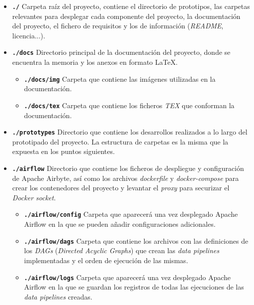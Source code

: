 \begin{itemize}
    \item \textbf{\texttt{./}} Carpeta raíz del proyecto, contiene el directorio de prototipos, las carpetas relevantes para desplegar cada componente del proyecto, la documentación del proyecto, el fichero de requisitos y los de información (\textit{README}, licencia...).

    \item \textbf{\texttt{./docs}} Directorio principal de la documentación del proyecto, donde se encuentra la memoria y los anexos en formato \LaTeX{}.

    \begin{itemize}
        \item \textbf{\texttt{./docs/img}} Carpeta que contiene las imágenes utilizadas en la documentación.
        \item \textbf{\texttt{./docs/tex}} Carpeta que contiene los ficheros \textit{TEX} que conforman la documentación.
    \end{itemize}

    \item \textbf{\texttt{./prototypes}} Directorio que contiene los desarrollos realizados a lo largo del prototipado del proyecto. La estructura de carpetas es la misma que la expuesta en los puntos siguientes.

    \item \textbf{\texttt{./airflow}} Directorio que contiene los ficheros de despliegue y configuración de Apache Airbyte, así como los archivos \textit{dockerfile} y \textit{docker-compose} para crear los contenedores del proyecto y levantar el \textit{proxy} para securizar el \textit{Docker socket}.

    \begin{itemize}
        \item \textbf{\texttt{./airflow/config}} Carpeta que aparecerá una vez desplegado Apache Airflow en la que se pueden añadir configuraciones adicionales.

        \item \textbf{\texttt{./airflow/dags}} Carpeta que contiene los archivos con las definiciones de los \textit{DAGs} (\textit{Directed Acyclic Graphs}) que crean las \textit{data pipelines} implementadas y el orden de ejecución de las mismas.

        \item \textbf{\texttt{./airflow/logs}} Carpeta que aparecerá una vez desplegado Apache Airflow en la que se guardan los registros de todas las ejecuciones de las \textit{data pipelines} creadas.


\end{itemize}
\end{itemize}
